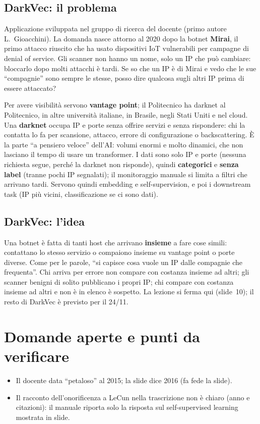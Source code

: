 \subsection{DarkVec: il problema}
Applicazione sviluppata nel gruppo di ricerca del docente (primo autore L.~Gioacchini). La domanda nasce
attorno al 2020 dopo la botnet \textbf{Mirai}, il primo attacco riuscito che ha usato dispositivi IoT
vulnerabili per campagne di denial of service. Gli scanner non hanno un nome, solo un IP che può cambiare:
bloccarlo dopo molti attacchi è tardi. Se so che un IP è di Mirai e vedo che le sue ``compagnie'' sono sempre
le stesse, posso dire qualcosa sugli altri IP prima di essere attaccato?

Per avere visibilità servono \textbf{vantage point}; il Politecnico ha darknet al Politecnico, in altre
università italiane, in Brasile, negli Stati Uniti e nel cloud. Una \textbf{darknet} occupa IP e porte senza
offrire servizi e senza rispondere: chi la contatta lo fa per scansione, attacco, errore di configurazione o
backscattering. È la parte ``a pensiero veloce'' dell'AI: volumi enormi e molto dinamici, che non lasciano il
tempo di usare un transformer. I dati sono solo IP e porte (nessuna richiesta segue, perché la darknet non
risponde), quindi \textbf{categorici} e \textbf{senza label} (tranne pochi IP segnalati); il monitoraggio
manuale si limita a filtri che arrivano tardi. Servono quindi embedding e self-supervision, e poi i downstream
task (IP più vicini, classificazione se ci sono dati).

\subsection{DarkVec: l'idea}
Una botnet è fatta di tanti host che arrivano \textbf{insieme} a fare cose simili: contattano lo stesso servizio
o compaiono insieme su vantage point o porte diverse. Come per le parole, ``si capisce cosa vuole un IP dalle
compagnie che frequenta''. Chi arriva per errore non compare con costanza insieme ad altri; gli scanner
benigni di solito pubblicano i propri IP; chi compare con costanza insieme ad altri e non è in elenco è
sospetto. La lezione si ferma qui (slide~10); il resto di DarkVec è previsto per il 24/11.

\section{Domande aperte e punti da verificare}
\begin{verifica}
\begin{itemize}
  \item Il docente data ``petaloso'' al 2015; la slide dice 2016 (fa fede la slide).
  \item Il racconto dell'onorificenza a LeCun nella trascrizione non è chiaro (anno e citazioni): il manuale
        riporta solo la risposta sul self-supervised learning mostrata in slide.
\end{itemize}
\end{verifica}
